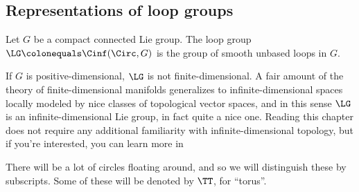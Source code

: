 
\subsection{Representations of loop groups}
\label{rep_loop}

\begin{definition}
	Let $G$ be a compact connected Lie group. The loop group $ \LG \colonequals \Cinf(\Circ, G)$ is the group of smooth unbased loops in $G$.
\end{definition}
If $G$ is positive-dimensional, $\LG$ is not finite-dimensional. A fair amount of the theory of finite-dimensional
manifolds generalizes to infinite-dimensional spaces locally modeled by nice classes of topological vector spaces,
and in this sense $\LG$ is an infinite-dimensional Lie group, in fact quite a nice one. Reading this chapter does
not require any additional familiarity with infinite-dimensional topology, but if you're interested, you can learn
more in \cites{Ham82}{Mil84}[\S 3.1]{loop}

There will be a lot of circles floating around, and so we will distinguish these
by subscripts. Some of these will be denoted by $\TT$, for ``torus''.

